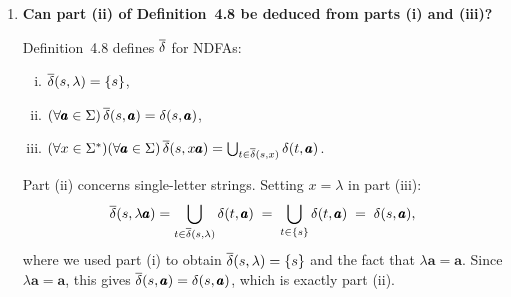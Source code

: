 \begin{enumerate}[{4.}1.]
\textbf{Construction.}  Let $A=\langle\Sigma,S,S_0,\delta,F\rangle$.  Define
$A'=\langle\Sigma,S',q_0,\delta',\{q_f\}\rangle$ where:
\begin{itemize}
  \item $S'=S\cup\{q_0,q_f\}$ (two new states).
  \item $q_0$ is the unique start state.
  \item $\delta'(q_0,\lambda)=S_0$ (a $\lambda$-transition from $q_0$ to every
        start state of $A$).
  \item For all $s\in S$ and $\pmb{a}\in\Sigma$: $\delta'(s,\pmb{a})=\delta(s,\pmb{a})$.
  \item $\delta'(f,\lambda)\ni q_f$ for every $f\in F$ ($\lambda$-transitions
        from each old final state to the new unique final state $q_f$).
  \item $\delta'(q_f,\pmb{a})=\emptyset$ for all $\pmb{a}$ (and no transitions
        out of $q_f$).
\end{itemize}

\textbf{Correctness.}  A word $w\in\Sigma^+$ is accepted by $A$ iff there is a
path $q_0\xrightarrow{\lambda}s_i\xrightarrow{w}f$ for some $s_i\in S_0$ and
$f\in F$; by the $\lambda$-transition $f\xrightarrow{\lambda}q_f$, this same
path exists in $A'$ ending at $q_f$.  Conversely, any accepting path in $A'$
uses the initial $\lambda$-step to some $s_i\in S_0$, processes $w$ within $S$
(by identical transitions), then uses a final $\lambda$-step to $q_f$, which
corresponds to an accepting path in $A$.  Hence $L(A')=L(A)$.

If $\lambda\in L(A)$ (i.e., some $s\in S_0\cap F$), then we additionally make
$q_0$ a final state.

\item \textbf{Can part (ii) of Definition~4.8 be deduced from parts (i) and (iii)?}

Definition~4.8 defines $\overline{\delta}$ for NDFAs:
\begin{enumerate}[(i)]
  \item $\overline{\delta}(s,\lambda)=\{s\}$,
  \item $(\forall\pmb{a}\in\Sigma)\,\overline{\delta}(s,\pmb{a})=\delta(s,\pmb{a})$,
  \item $(\forall x\in\Sigma^*)(\forall\pmb{a}\in\Sigma)\,\overline{\delta}(s,x\pmb{a})
        =\bigcup_{t\in\overline{\delta}(s,x)}\delta(t,\pmb{a})$.
\end{enumerate}
Part (ii) concerns single-letter strings.  Setting $x=\lambda$ in part (iii):
\[
  \overline{\delta}(s,\lambda\pmb{a})
  =\bigcup_{t\in\overline{\delta}(s,\lambda)}\delta(t,\pmb{a})
  \;=\;\bigcup_{t\in\{s\}}\delta(t,\pmb{a})
  \;=\;\delta(s,\pmb{a}),
\]
where we used part (i) to obtain $\overline{\delta}(s,\lambda)=\{s\}$ and the fact that
$\lambda\pmb{a}=\pmb{a}$.  Since $\lambda\pmb{a}=\pmb{a}$, this gives
$\overline{\delta}(s,\pmb{a})=\delta(s,\pmb{a})$, which is exactly part (ii).


\end{enumerate}
